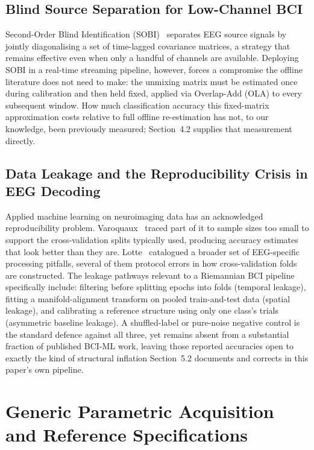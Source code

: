 \documentclass[11pt]{article}
\begin{document}
\subsection{Blind Source Separation for Low-Channel BCI}

Second-Order Blind Identification (SOBI)~\cite{belouchrani1997} separates EEG source signals by jointly diagonalising a set of time-lagged covariance matrices, a strategy that remains effective even when only a handful of channels are available. Deploying SOBI in a real-time streaming pipeline, however, forces a compromise the offline literature does not need to make: the unmixing matrix must be estimated once during calibration and then held fixed, applied via Overlap-Add (OLA) to every subsequent window. How much classification accuracy this fixed-matrix approximation costs relative to full offline re-estimation has not, to our knowledge, been previously measured; Section~4.2 supplies that measurement directly.

\subsection{Data Leakage and the Reproducibility Crisis in EEG Decoding}

Applied machine learning on neuroimaging data has an acknowledged reproducibility problem. Varoquaux~\cite{varoquaux2018} traced part of it to sample sizes too small to support the cross-validation splits typically used, producing accuracy estimates that look better than they are. Lotte~\cite{lotte2014} catalogued a broader set of EEG-specific processing pitfalls, several of them protocol errors in how cross-validation folds are constructed. The leakage pathways relevant to a Riemannian BCI pipeline specifically include: filtering before splitting epochs into folds (temporal leakage), fitting a manifold-alignment transform on pooled train-and-test data (spatial leakage), and calibrating a reference structure using only one class's trials (asymmetric baseline leakage). A shuffled-label or pure-noise negative control is the standard defence against all three, yet remains absent from a substantial fraction of published BCI-ML work, leaving those reported accuracies open to exactly the kind of structural inflation Section~5.2 documents and corrects in this paper's own pipeline.

\section{Generic Parametric Acquisition and Reference Specifications}
\end{document}
